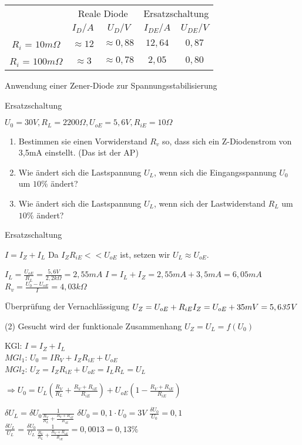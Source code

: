 \documentclass[german]{article}
\newcommand{\ohm}{\Omega}
\begin{document}
\begin{tabular}{c|c|c|c|c}
	 & \multicolumn{2}{|c|}{Reale Diode} & \multicolumn{2}{|c|}{Ersatzschaltung} \\
	 & $I_D/A$ & $U_D/V$ & $I_{DE}/A$ & $U_{DE}/V$ \\
	$R_i$ = $10m\ohm$ & $\approx 12$ & $\approx 0,88$ & $12,64$ & $0,87$ \\
	$R_i$ = $100m\ohm$ & $\approx 3$ & $\approx 0,78$ & $2,05$ & $0,80$
\end{tabular}

Anwendung einer Zener-Diode zur Spannungsstabilisierung

Ersatzschaltung

$U_0 = 30V, R_L = 2200\ohm, U_{oE} = 5,6V, R_{iE} = 10\ohm$

\begin{enumerate}
	\item Bestimmen sie einen Vorwiderstand $R_v$ so, dass sich ein Z-Diodenstrom von 3,5mA einstellt. (Das ist der AP)
	\item Wie ändert sich die Lastspannung $U_L$, wenn sich die Eingangsspannung $U_0$ um $10 \%$ ändert?
	\item Wie ändert sich die Lastspannung $U_L$, wenn sich der Lastwiderstand $R_L$ um $10 \%$ ändert?
\end{enumerate}

Ersatzschaltung

$I = I_Z + I_L$
Da $I_Z R_{iE} << U_{oE}$ ist, setzen wir $U_L \approx U_{oE}$.

$I_L = \frac{U_{oE}}{R_L} = \frac{5,6V}{2,2 k\ohm} = 2,55 mA$
$I = I_L + I_Z = 2,55 mA + 3,5 mA = 6,05 mA$
$R_v = \frac{U_0 - U_{oE}}{I} = 4,03 k\ohm$

Überprüfung der Vernachlässigung
$U_Z = U_{oE} + R_{iE} I_Z = U_{oE} + 35mV = 5,6{\it 35} V$

(2) Gesucht wird der funktionale Zusammenhang $U_Z = U_L = f(U_0)$

KGl: $I = I_Z + I_L$ \\
$MGl_1$: $U_0 = IR_V + I_Z R_{iE} + U_{oE}$ \\
$MGl_2$: $U_Z = I_Z R_{iE} + U_{oE} = I_L R_L = U_L$

$\Rightarrow U_0 = U_L \left( \frac{R_V}{R_L} + \frac{R_V + R_{iE}}{R_{iE}} \right) + U_{oE} \left( 1 - \frac{R_V + R_{iE}}{R_{iE}} \right)$

$\delta U_L = \delta U_0 \frac{1}{\frac{R_V}{R_L} + \frac{R_V + R_{iE}}{R_{iE}}}$ $\delta U_0 = 0,1 \cdot U_0 = 3V$ $\frac{\delta U_0}{U_0} = 0,1$
$\frac{\delta U_L}{U_L} = \frac{\delta U_0}{U_L} \frac{1}{\frac{R_V}{R_L} + \frac{R_V + R_{iE}}{R_{iE}}} = 0,0013 = 0,13 \%$
\end{document}
